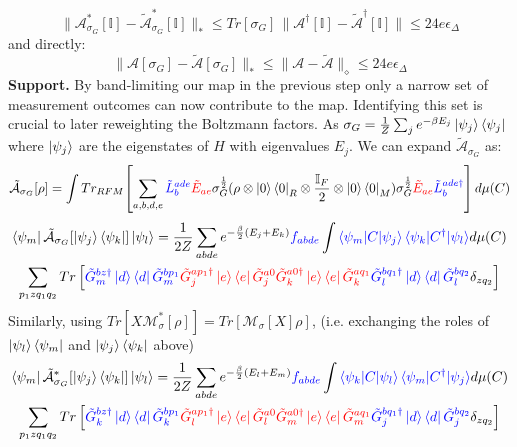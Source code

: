 \documentclass[aps,floatfix,10pt,amssymb,amsfont,amsmath,superscriptaddress,float,nofootinbib,longbibliography,nobalancelastpage,twocolumn]{revtex4-2}
\begin{document}
\begin{equation}
    \|\mathcal{A}^*_{\sigma_G}[\mathbb{I}] - \tilde{\mathcal{A}}^*_{\sigma_G}[\mathbb{I}]\|_* \leq Tr[\sigma_G]\,\|\mathcal{A}^{\dagger}[\mathbb{I}] - \tilde{\mathcal{A}}^{\dagger}[\mathbb{I}]\| \leq 24e\epsilon_{\Delta}
    \label{eq:AAtildeclose1}
\end{equation}
and directly:
\begin{equation}
    \|\mathcal{A}[\sigma_G] - \tilde{\mathcal{A}}[\sigma_G]\|_* \leq \|\mathcal{A}-\tilde{\mathcal{A}}\|_{\diamond} \leq 24e\epsilon_{\Delta}
    \label{eq:AAtildeclose2}
\end{equation}
\textbf{Support.} By band-limiting our map in the previous step only a narrow set of measurement outcomes can now contribute to the map. Identifying this set is crucial to later reweighting the Boltzmann factors. As $\sigma_G = \frac{1}{Z}\sum_j e^{-\beta E_j} \ket{\psi_j}\bra{\psi_j}$ where $\ket{\psi_j}$ are the eigenstates of $H$ with eigenvalues $E_j$. We can expand $\tilde{\mathcal{A}}_{\sigma_G}$ as:
    \begin{equation}
    \tilde{\mathcal{A}}_{\sigma_G}[\rho] = \int Tr_{RFM}\!\left[\sum_{a,b,d,e}\textcolor{blue}{\tilde L^{ade}_b} \textcolor{red}{\tilde E_{ae}} \sigma_G^{\frac{1}{2}} (\rho\otimes \ket{0}\bra{0}_R \otimes \frac{\mathbb{I}_F}{2}\otimes \ket{0}\bra{0}_M) \sigma_G^{\frac{1}{2}}\textcolor{red}{\tilde E_{ae}}\textcolor{blue}{\tilde L^{ade\dagger}_b}\right] d\mu(C)
\end{equation}
\begin{multline}
    \bra{\psi_m}\tilde{\mathcal{A}}_{\sigma_G}[\ket{\psi_j}\bra{\psi_k}]\ket{\psi_l}=\frac{1}{2Z} \sum_{abde} e^{-\frac{\beta}{2}(E_j+E_k)}\textcolor{blue}{f_{abde}} \int \textcolor{blue}{\braket{\psi_m|C|\psi_j}\braket{\psi_k|C^{\dagger}|\psi_l}} d\mu(C)\\\sum_{p_1zq_1 q_2}Tr\left[\textcolor{blue}{\tilde G^{bz\dagger}_m\ket{d}\bra{d}\tilde G^{bp_1}_m} \textcolor{red}{\tilde G_j^{ap_1\dagger}\ket{e}\bra{e}\tilde G_j^{a0}\tilde G_k^{a0\dagger}\ket{e}\bra{e}\tilde G_k^{aq_1}} \textcolor{blue}{\tilde G^{bq_1\dagger}_l\ket{d}\bra{d}\tilde G^{bq_2}_l} \delta_{zq_2}\right]
    \label{eq:Arho}
\end{multline}
Similarly, using $Tr[X\mathcal{M}^*_{\sigma}[\rho]] = Tr[\mathcal{M}_{\sigma}[X]\rho]$, (i.e. exchanging the roles of $\ket{\psi_l}\bra{\psi_m}$ and $\ket{\psi_j}\bra{\psi_k}$ above)
\begin{multline}
   \bra{\psi_m}\tilde{\mathcal{A}}^*_{\sigma_G}[\ket{\psi_j}\bra{\psi_k}]\ket{\psi_l} =\frac{1}{2Z} \sum_{abde} e^{-\frac{\beta}{2}(E_l+E_m)}\textcolor{blue}{f_{abde}} \int \textcolor{blue}{\braket{\psi_k|C|\psi_l}\braket{\psi_m|C^{\dagger}|\psi_j}} d\mu(C)\\\sum_{p_1z q_1 q_2} Tr\left[\textcolor{blue}{\tilde G^{bz\dagger}_k\ket{d}\bra{d}\tilde G^{bp_1}_k} \textcolor{red}{\tilde G_l^{ap_1\dagger}\ket{e}\bra{e}\tilde G_l^{a0}\tilde G_m^{a0\dagger}\ket{e}\bra{e}\tilde G_m^{aq_1}} \textcolor{blue}{\tilde G^{bq_1\dagger}_j\ket{d}\bra{d}\tilde G^{bq_2}_j } \delta_{zq_2}\right]
    \label{eq:A*rho}
\end{multline}
\end{document}
